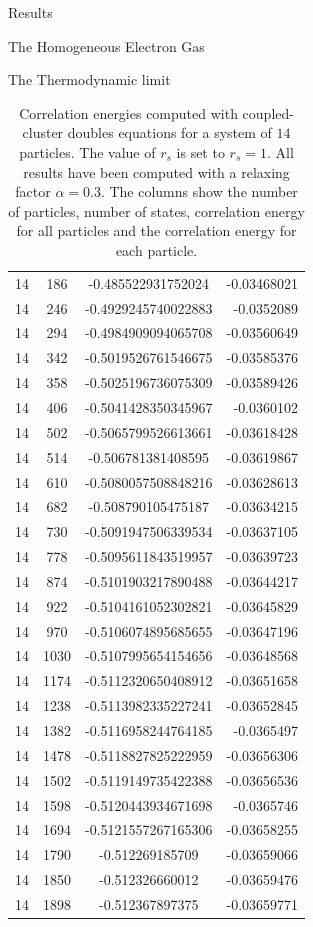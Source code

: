 \documentclass[twoside,english]{uiofysmaster}
\begin{document}
\begin{chapter}{Results}
\begin{section}{The Homogeneous Electron Gas}
\begin{subsection}{The Thermodynamic limit}
\begin{table}[H]
\begin{center}
\begin{tabular}[center]{l  c  c r}
						14 & 186 & -0.485522931752024  & -0.03468021\\
						14 & 246 & -0.4929245740022883 & -0.0352089\\
						14 & 294 & -0.4984909094065708 & -0.03560649\\
						14 & 342 & -0.5019526761546675 & -0.03585376\\
						14 & 358 & -0.5025196736075309 & -0.03589426\\
						14 & 406 & -0.5041428350345967 & -0.0360102\\
						14 & 502 & -0.5065799526613661 & -0.03618428\\
						14 & 514 & -0.506781381408595  & -0.03619867\\
						14 & 610 & -0.5080057508848216 & -0.03628613\\
						14 & 682 & -0.508790105475187  & -0.03634215\\
						14 & 730 & -0.5091947506339534 & -0.03637105\\
						14 & 778 & -0.5095611843519957 & -0.03639723\\
						14 & 874 & -0.5101903217890488 & -0.03644217\\
						14 & 922 & -0.5104161052302821 & -0.03645829\\
						14 & 970 & -0.5106074895685655 & -0.03647196\\
						14 & 1030& -0.5107995654154656 & -0.03648568\\
						14 & 1174& -0.5112320650408912 & -0.03651658\\
						14 & 1238& -0.5113982335227241 & -0.03652845\\
						14 & 1382& -0.5116958244764185 & -0.0365497\\
						14 & 1478& -0.5118827825222959 & -0.03656306\\
						14 & 1502& -0.5119149735422388 & -0.03656536\\
						14 & 1598& -0.5120443934671698 & -0.0365746\\
						14 & 1694& -0.5121557267165306 & -0.03658255\\
						14 & 1790& -0.512269185709 & -0.03659066\\
						14 & 1850& -0.512326660012 & -0.03659476\\
						14 & 1898& -0.512367897375 & -0.03659771\\
					\end{tabular}
				\end{center}
				\caption{Correlation energies computed with coupled-cluster doubles equations for a system of $14$ particles. The value of $r_s$ is set to $r_s=1$. All results have been computed with a relaxing factor $\alpha=0.3$. The columns show the number of particles, number of states, correlation energy for all particles and the correlation energy for each particle.}
				\label{table:ThermodynamicLimit1}
			\end{table}


\end{subsection}
\end{section}
\end{chapter}
\end{document}

